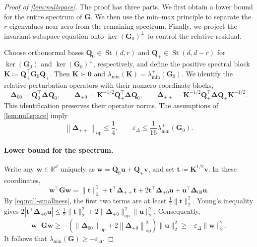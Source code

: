 \documentclass[11pt]{article}
\newcommand{\R}{\mathbb{R}}
\newcommand{\trans}{\top}
\DeclareMathOperator{\St}{St}
\newcommand{\opn}[1]{\left\lVert #1\right\rVert_{\mathrm{op}}}
\newcommand{\bze}{\bm{0}}
\begin{document}
\begin{proof}[Proof of \cref{lem:nullspace}]
The proof has three parts.  We first obtain a lower bound for the entire
spectrum of $\bm G$.  We then use the min--max principle to separate the
$r$ eigenvalues near zero from the remaining spectrum.  Finally, we project
the invariant-subspace equation onto $\ker(\bm G_0)^\perp$ to control the
relative residual.


Choose orthonormal bases
$\bm Q_0\in\St(d,r)$ and
$\bm Q_+\in\St(d,d-r)$
for $\ker(\bm G_0)$ and $\ker(\bm G_0)^\perp$, respectively, and define the
positive spectral block
$\bm K\coloneqq\bm Q_+^\trans\bm G_0\bm Q_+$.
Then $\bm K\succ\bze$ and
$\lambda_{\min}(\bm K)=\lambda_{\min}^{+}(\bm G_0)$.
We identify the relative perturbation operators with their nonzero coordinate
blocks,
\[
  \bm\Delta_{00}
  =
  \bm Q_0^\trans\bm\Delta\bm Q_0,
  \qquad
  \bm\Delta_{+0}
  =
  \bm K^{-1/2}\bm Q_+^\trans\bm\Delta\bm Q_0,
  \qquad
  \bm\Delta_{++}
  =
  \bm K^{-1/2}
  \bm Q_+^\trans\bm\Delta\bm Q_+
  \bm K^{-1/2}.
\]
This identification preserves their operator norms.  The assumptions of
\cref{lem:nullspace} imply
\begin{equation}
\label{eq:null-smallness}
  \opn{\bm\Delta_{++}}\le\frac14,
  \qquad
  \varepsilon_\Delta
  \le\frac{1}{16}\lambda_{\min}^{+}(\bm G_0).
\end{equation}

\paragraph{Lower bound for the spectrum.}
Write any $\bm w\in\R^d$ uniquely as
$\bm w=\bm Q_0\bm u+\bm Q_+\bm v$, and set
$\bm t\coloneqq\bm K^{1/2}\bm v$.  In these coordinates,
\begin{equation}
\label{eq:null-quadratic-form}
  \bm w^\trans\bm G\bm w
  =
  \|\bm t\|_2^2
  +
  \bm t^\trans\bm\Delta_{++}\bm t
  +
  2\bm t^\trans\bm\Delta_{+0}\bm u
  +
  \bm u^\trans\bm\Delta_{00}\bm u.
\end{equation}
By \cref{eq:null-smallness}, the first two terms are at least
$\frac12\|\bm t\|_2^2$.  Young's inequality gives
$2|\bm t^\trans\bm\Delta_{+0}\bm u|
\le\frac12\|\bm t\|_2^2+
2\|\bm\Delta_{+0}\|_{\mathrm{op}}^2\|\bm u\|_2^2$.
Consequently,
\[
  \bm w^\trans\bm G\bm w
  \ge
  -\left(
    \opn{\bm\Delta_{00}}
    +
    2\opn{\bm\Delta_{+0}}^2
  \right)
  \|\bm u\|_2^2
  \ge
  -\varepsilon_\Delta\|\bm w\|_2^2.
\]
It follows that $\lambda_{\min}(\bm G)\ge-\varepsilon_\Delta$.


\end{proof}
\end{document}
